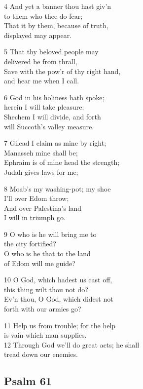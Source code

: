 \begin{multicols}{3}
4 And yet a banner thou hast giv’n\\
to them who thee do fear;\\
That it by them, because of truth,\\
displayed may appear.

5 That thy beloved people may\\
delivered be from thrall,\\
Save with the pow’r of thy right hand,\\
and hear me when I call.

6 God in his holiness hath spoke;\\
herein I will take pleasure:\\
Shechem I will divide, and forth\\
will Succoth’s valley measure.

7 Gilead I claim as mine by right;\\
Manasseh mine shall be;\\
Ephraim is of mine head the strength;\\
Judah gives laws for me;

8 Moab’s my washing-pot; my shoe\\
I’ll over Edom throw;\\
And over Palestina’s land\\
I will in triumph go.

9 O who is he will bring me to\\
the city fortified?\\
O who is he that to the land\\
of Edom will me guide?

10 O God, which hadest us cast off,\\
this thing wilt thou not do?\\
Ev’n thou, O God, which didest not\\
forth with our armies go?

11 Help us from trouble; for the help\\
is vain which man supplies.\\
12 Through God we’ll do great acts; he shall\\
tread down our enemies.



\begin{center}
\quad{}\quad{}
\end{center}

\subsection*{Psalm 61}


\end{multicols}
